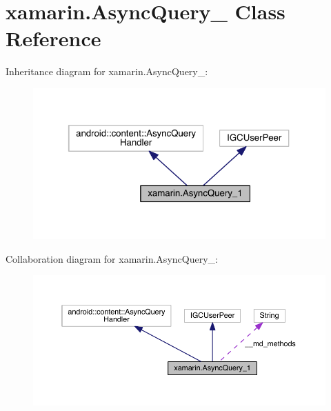 \hypertarget{classxamarin_1_1_async_query__1}{\section{xamarin.\+Async\+Query\+\_ Class Reference}
\label{classxamarin_1_1_async_query__1}
}


Inheritance diagram for xamarin.\+Async\+Query\+\_\+:
\nopagebreak
\begin{figure}[H]
\begin{center}
\leavevmode
\includegraphics[width=321pt]{classxamarin_1_1_async_query__1__inherit__graph}
\end{center}
\end{figure}


Collaboration diagram for xamarin.\+Async\+Query\+\_\+:
\nopagebreak
\begin{figure}[H]
\begin{center}
\leavevmode
\includegraphics[width=350pt]{classxamarin_1_1_async_query__1__coll__graph}
\end{center}
\end{figure}
